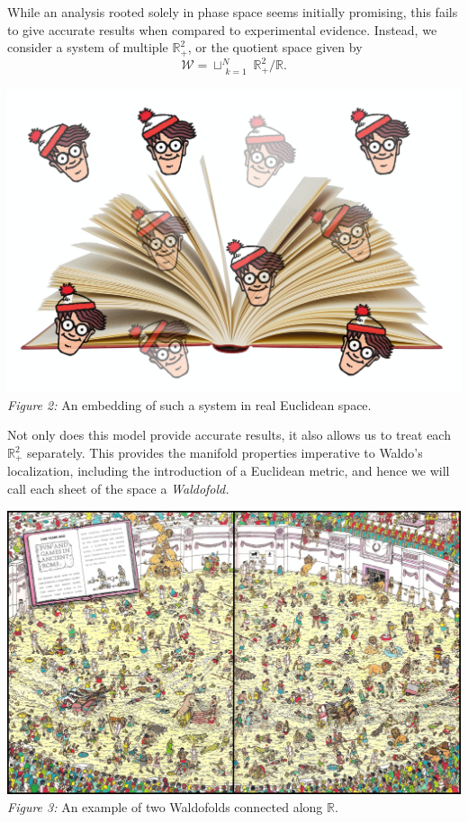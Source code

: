 \documentclass{article}
\begin{document}
While an analysis rooted solely in phase space seems initially promising, this fails to give accurate results when compared to experimental evidence. Instead, we consider a system of multiple $\mathbb{R}_+^{2}$, or the quotient space given by
\begin{equation}
	\mathcal{W} = \sqcup^N_{\substack{k=1}} \mathbb{R}^2_+ / \mathbb{R}.
\end{equation}
\begin{center}
	\includegraphics[scale=.1]{waldospace.png}\\
	\emph{Figure 2:} An embedding of such a system in real Euclidean space.
\end{center}
Not only does this model provide accurate results, it also allows us to treat each $\mathbb{R}_+^{2}$ separately. This provides the manifold properties imperative to Waldo's localization, including the introduction of a Euclidean metric, and  hence we will call each sheet of the space a \emph{Waldofold.}
\begin{center}
	\includegraphics[scale=.1]{waldofold.jpg}\\
\emph{Figure 3:} An example of two Waldofolds connected along $\mathbb{R}$.
\end{center}
\end{document}
